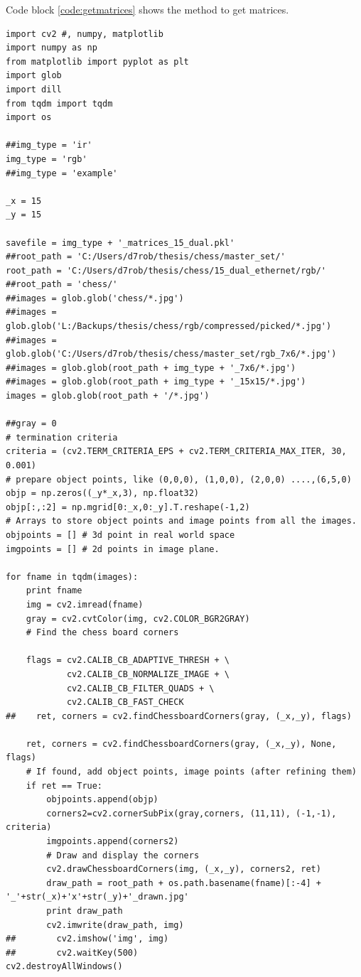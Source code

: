 \begin{appendices}
Code block \ref{code:getmatrices} shows the method to get matrices.

\begin{lstlisting}
import cv2 #, numpy, matplotlib
import numpy as np
from matplotlib import pyplot as plt
import glob
import dill
from tqdm import tqdm
import os

##img_type = 'ir'
img_type = 'rgb'
##img_type = 'example'

_x = 15
_y = 15

savefile = img_type + '_matrices_15_dual.pkl'
##root_path = 'C:/Users/d7rob/thesis/chess/master_set/'
root_path = 'C:/Users/d7rob/thesis/chess/15_dual_ethernet/rgb/'
##root_path = 'chess/'
##images = glob.glob('chess/*.jpg')
##images = glob.glob('L:/Backups/thesis/chess/rgb/compressed/picked/*.jpg')
##images = glob.glob('C:/Users/d7rob/thesis/chess/master_set/rgb_7x6/*.jpg')
##images = glob.glob(root_path + img_type + '_7x6/*.jpg')
##images = glob.glob(root_path + img_type + '_15x15/*.jpg')
images = glob.glob(root_path + '/*.jpg')

##gray = 0
# termination criteria
criteria = (cv2.TERM_CRITERIA_EPS + cv2.TERM_CRITERIA_MAX_ITER, 30, 0.001)
# prepare object points, like (0,0,0), (1,0,0), (2,0,0) ....,(6,5,0)
objp = np.zeros((_y*_x,3), np.float32)
objp[:,:2] = np.mgrid[0:_x,0:_y].T.reshape(-1,2)
# Arrays to store object points and image points from all the images.
objpoints = [] # 3d point in real world space
imgpoints = [] # 2d points in image plane.

for fname in tqdm(images):
    print fname
    img = cv2.imread(fname)
    gray = cv2.cvtColor(img, cv2.COLOR_BGR2GRAY)
    # Find the chess board corners
    
    flags = cv2.CALIB_CB_ADAPTIVE_THRESH + \
            cv2.CALIB_CB_NORMALIZE_IMAGE + \
            cv2.CALIB_CB_FILTER_QUADS + \
            cv2.CALIB_CB_FAST_CHECK
##    ret, corners = cv2.findChessboardCorners(gray, (_x,_y), flags)

    ret, corners = cv2.findChessboardCorners(gray, (_x,_y), None, flags)
    # If found, add object points, image points (after refining them)
    if ret == True:
        objpoints.append(objp)
        corners2=cv2.cornerSubPix(gray,corners, (11,11), (-1,-1), criteria)
        imgpoints.append(corners2)
        # Draw and display the corners
        cv2.drawChessboardCorners(img, (_x,_y), corners2, ret)
        draw_path = root_path + os.path.basename(fname)[:-4] + '_'+str(_x)+'x'+str(_y)+'_drawn.jpg'
        print draw_path
        cv2.imwrite(draw_path, img)
##        cv2.imshow('img', img)
##        cv2.waitKey(500)
cv2.destroyAllWindows()


\end{lstlisting}
\end{appendices}
